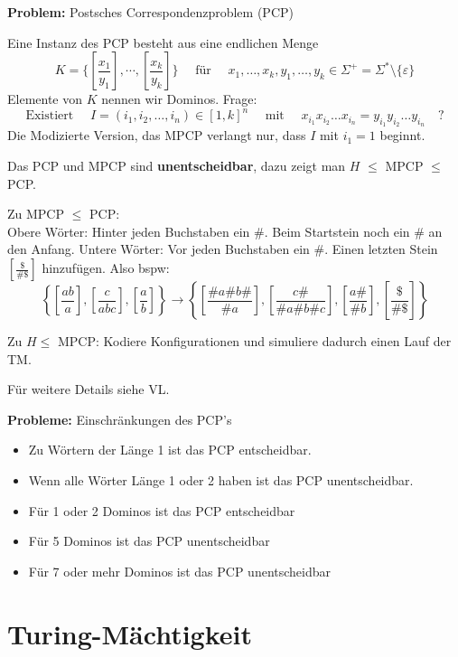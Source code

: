 \documentclass[a4paper,graphics,11pt]{article}
\newcommand{\eps}[0]{\varepsilon}
\begin{document}
\strut

\textbf{Problem:} Postsches Correspondenzproblem (PCP)

Eine Instanz des PCP besteht aus eine endlichen Menge
$$
    K = \{\left[\frac{x_1}{y_1}\right], \cdots, \left[\frac{x_k}{y_k}\right]\}
    \quad \text{ für }\quad
    x_1,\dots,x_k,y_1,\dots,y_k \in \Sigma^+ = \Sigma^* \setminus \{\eps\}
$$
Elemente von $K$ nennen wir Dominos.
Frage:
$$
    \text{Existiert }\quad
    I = (i_1,i_2,\dots,i_n) \in [1,k]^n
    \quad\text{ mit }\quad
    x_{i_1}x_{i_2}\dots x_{i_n} = y_{i_1}y_{i_2}\dots y_{i_n}
    \quad ?
$$
Die Modizierte Version, das MPCP verlangt nur, dass $I$ mit $i_1 = 1$ beginnt.

Das PCP und MPCP sind \textbf{unentscheidbar}, dazu zeigt man $H$ $\leq$ MPCP $\leq$ PCP.

Zu MPCP $\leq$ PCP:\\
Obere Wörter: Hinter jeden Buchstaben ein \#. Beim Startstein noch ein \# an den Anfang.
Untere Wörter: Vor jeden Buchstaben ein \#. Einen letzten Stein $\left[\frac{\$}{\#\$}\right]$ hinzufügen. Also bspw:
$$
    \left\{\left[\frac{ab}{a}\right], \left[\frac{c}{abc}\right], \left[\frac{a}{b}\right]\right\}
    \longrightarrow \left\{\left[\frac{\#a\#b\#}{\#a}\right], \left[\frac{c\#}{\#a\#b\#c}\right], \left[\frac{a\#}{\#b}\right],\left[\frac{\$}{\#\$}\right]\right\}
$$

Zu $H \leq$ MPCP:
Kodiere Konfigurationen und simuliere dadurch einen Lauf der TM.

Für weitere Details siehe VL.

\strut

\textbf{Probleme:} Einschränkungen des PCP's
\begin{itemize}
    \item Zu Wörtern der Länge 1 ist das PCP entscheidbar.
    \item Wenn alle Wörter Länge 1 oder 2 haben ist das PCP unentscheidbar.
    \\[5pt]
    \item Für 1 oder 2 Dominos ist das PCP entscheidbar
    \item Für 5 Dominos ist das PCP unentscheidbar
    \item Für 7 oder mehr Dominos ist das PCP unentscheidbar
\end{itemize}



\newpage



\section{Turing-Mächtigkeit}
\end{document}
